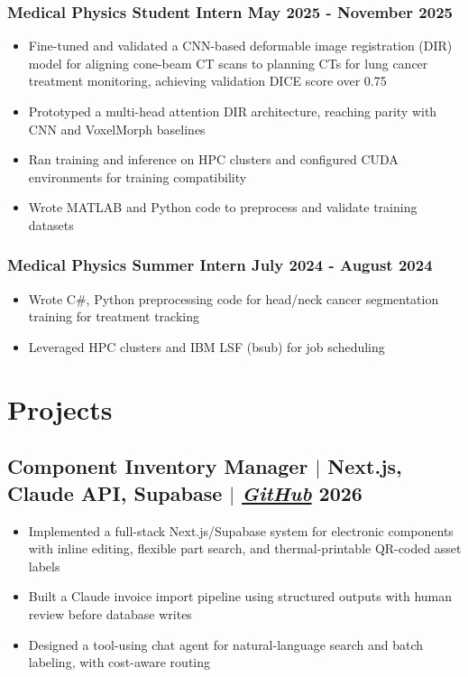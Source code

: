 \documentclass[10pt]{article}
\begin{document}
\subsubsection{Medical Physics Student Intern \hfill May 2025 - November 2025}
\begin{itemize}
    \item Fine-tuned and validated a CNN-based deformable image registration (DIR) model for aligning cone-beam CT scans to planning CTs for lung cancer treatment monitoring, achieving validation DICE score over 0.75
    \item Prototyped a multi-head attention DIR architecture, reaching parity with CNN and VoxelMorph baselines
    \item Ran training and inference on HPC clusters and configured CUDA environments for training compatibility
    \item Wrote MATLAB and Python code to preprocess and validate training datasets
\end{itemize}
\subsubsection{Medical Physics Summer Intern \hfill July 2024 - August 2024}
\begin{itemize}
    \item Wrote C\#, Python preprocessing code for head/neck cancer segmentation training for treatment tracking
    \item Leveraged HPC clusters and IBM LSF (bsub) for job scheduling
\end{itemize}


\section{Projects}

\subsection{Component Inventory Manager {\normalfont $|$ Next.js, Claude API, Supabase} {\normalfont $|$ \href{https://github.com/Hugoyhu/hugohu.me}{\textit{GitHub}}} \hfill 2026}
\begin{itemize}
    \item Implemented a full-stack Next.js/Supabase system for electronic components with inline editing, flexible part search, and thermal-printable QR-coded asset labels
    \item Built a Claude invoice import pipeline using structured outputs with human review before database writes
    \item Designed a tool-using chat agent for natural-language search and batch labeling, with cost-aware routing
\end{itemize}
\end{document}
